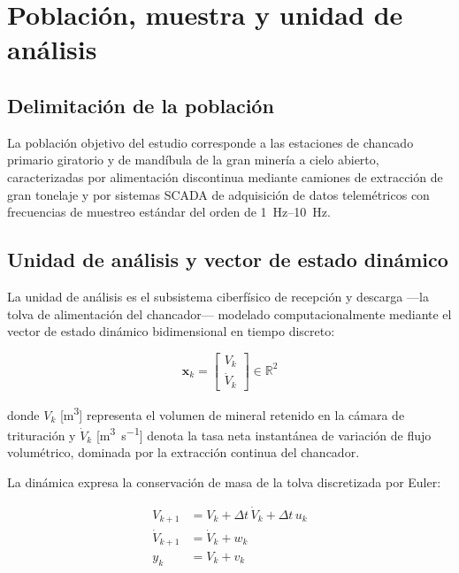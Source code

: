 \section{Población, muestra y unidad de análisis}
\label{sec:unidad}

\subsection{Delimitación de la población}

La población objetivo del estudio corresponde a las estaciones de chancado
primario giratorio y de mandíbula de la gran minería a cielo abierto,
caracterizadas por alimentación discontinua mediante camiones de extracción de
gran tonelaje y por sistemas SCADA de adquisición de datos telemétricos con
frecuencias de muestreo estándar del orden de \SIrange{1}{10}{\hertz}.

\subsection{Unidad de análisis y vector de estado dinámico}

La unidad de análisis es el subsistema ciberfísico de recepción y descarga —la
tolva de alimentación del chancador— modelado computacionalmente mediante el
vector de estado dinámico bidimensional en tiempo discreto:

\begin{equation}
\mathbf{x}_{k} = \begin{bmatrix} V_{k} \\ \dot{V}_{k} \end{bmatrix}
\in \mathbb{R}^{2}
\label{eq:vector-estado}
\end{equation}

donde $V_{k}$ [\si{\metre\cubed}] representa el volumen de mineral retenido en
la cámara de trituración y $\dot{V}_{k}$ [\si{\metre\cubed\per\second}] denota
la tasa neta instantánea de variación de flujo volumétrico, dominada por la
extracción continua del chancador.

La dinámica expresa la conservación de masa de la tolva discretizada por Euler:

\begin{align}
V_{k+1} &= V_{k} + \Delta t\,\dot{V}_{k} + \Delta t\,u_{k}\\
\dot{V}_{k+1} &= \dot{V}_{k} + w_{k}\\
y_{k} &= V_{k} + v_{k}
\end{align}

